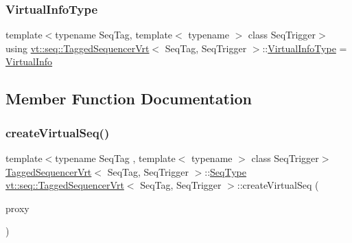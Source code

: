 \subsubsection{\texorpdfstring{Virtual\+Info\+Type}{VirtualInfoType}}
{\footnotesize\ttfamily template$<$typename Seq\+Tag, template$<$ typename $>$ class Seq\+Trigger$>$ \\
using \hyperlink{structvt_1_1seq_1_1_tagged_sequencer_vrt}{vt\+::seq\+::\+Tagged\+Sequencer\+Vrt}$<$ Seq\+Tag, Seq\+Trigger $>$\+::\hyperlink{structvt_1_1seq_1_1_tagged_sequencer_vrt_a19c5f10f5710fee8cd202735af8aa17f}{Virtual\+Info\+Type} =  \hyperlink{structvt_1_1seq_1_1_virtual_info}{Virtual\+Info}}



\subsection{Member Function Documentation}
\mbox{\label{structvt_1_1seq_1_1_tagged_sequencer_vrt_af7d9b524bcfab43dbc06c3a6b3e140f0}} 
\subsubsection{\texorpdfstring{create\+Virtual\+Seq()}{createVirtualSeq()}}
{\footnotesize\ttfamily template$<$typename Seq\+Tag , template$<$ typename $>$ class Seq\+Trigger$>$ \\
\hyperlink{structvt_1_1seq_1_1_tagged_sequencer_vrt}{Tagged\+Sequencer\+Vrt}$<$ Seq\+Tag, Seq\+Trigger $>$\+::\hyperlink{structvt_1_1seq_1_1_tagged_sequencer_a1c8ee839258d0f88c49ef660267a81d5}{Seq\+Type} \hyperlink{structvt_1_1seq_1_1_tagged_sequencer_vrt}{vt\+::seq\+::\+Tagged\+Sequencer\+Vrt}$<$ Seq\+Tag, Seq\+Trigger $>$\+::create\+Virtual\+Seq (\begin{DoxyParamCaption}\item[{\hyperlink{namespacevt_a1b417dd5d684f045bb58a0ede70045ac}{Virtual\+Proxy\+Type} const \&}]{proxy }\end{DoxyParamCaption})}

\mbox{\label{structvt_1_1seq_1_1_tagged_sequencer_vrt_ab022ac29916fd6b9df9161567cbbd910}} 

